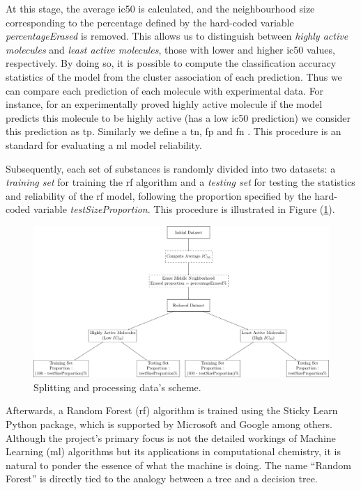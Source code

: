\documentclass[11pt]{article}
\begin{document}
At this stage, the average \gls{ic50} is calculated, and the neighbourhood size corresponding to the percentage defined by the hard-coded variable \emph{percentageErased} is removed. This allows us to distinguish between \emph{highly active molecules} and \emph{least active molecules}, those with lower and higher \gls{ic50} values, respectively. By doing so, it is possible to compute the classification accuracy statistics of the model from the cluster association of each prediction. Thus we can compare each prediction of each molecule with experimental data. For instance, for an experimentally proved highly active molecule if the model predicts this molecule to be highly active (has a low \gls{ic50} prediction) we consider this prediction as \gls{tp}. Similarly we define a \gls{tn}, \gls{fp} and \gls{fn} . This procedure is an standard for evaluating a \gls{ml} model reliability. 

Subsequently, each set of substances is randomly divided into two datasets: a \emph{training set} for training the \gls{rf} algorithm and a \emph{testing set} for testing the statistics and reliability of the \gls{rf} model, following the proportion specified by the hard-coded variable \emph{testSizeProportion}. This procedure is illustrated in Figure (\ref{FigureDataSplittingDiagram}).

\begin{figure}[H]
\centering
\includegraphics[width = \textwidth]{GeneralSources/DataSplittingDiagram.pdf}
\caption{Splitting and processing data's scheme.}
\label{FigureDataSplittingDiagram}
\end{figure}

Afterwards, a Random Forest (\gls{rf}) algorithm is trained using the Sticky Learn \cite{PythonPackageStickitLearn} Python package, which is supported by Microsoft and Google among others. Although the project’s primary focus is not the detailed workings of Machine Learning (\gls{ml}) algorithms but its applications in computational chemistry, it is natural to ponder the essence of what the machine is doing. The name “Random Forest” is directly tied to the analogy between a tree and a decision tree. \par
\end{document}
